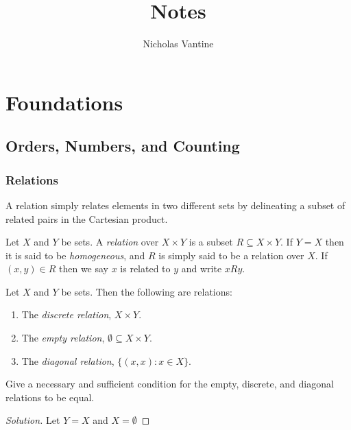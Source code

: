 \documentclass[12pt]{book}
\title{Notes}
\author{Nicholas Vantine}
\date{}
\begin{document}
\maketitle
\tableofcontents


\chapter{Foundations}

\section{Orders, Numbers, and Counting}

\subsection{Relations}

A relation simply relates elements in two different sets by delineating a subset of related pairs in the Cartesian product.

\begin{definition}
Let $X$ and $Y$ be sets. A \emph{relation} over $X \times Y$ is a subset $R \subseteq X \times Y$. If $Y = X$ then it is said to be \emph{homogeneous}, and $R$ is simply said to be a relation over $X$. If $(x,y) \in R$ then we say $x$ is related to $y$ and write $xRy$.
\end{definition}

\begin{example}
Let $X$ and $Y$ be sets. Then the following are relations:
\begin{enumerate}
    \item The \emph{discrete relation}, $X \times Y$.
    \item The \emph{empty relation}, $\emptyset \subseteq X \times Y$.
    \item The \emph{diagonal relation}, $\{(x,x) : x \in X\}$.
\end{enumerate}
\end{example}


\begin{exercise}
Give a necessary and sufficient condition for the empty, discrete, and diagonal relations to be equal.
\end{exercise}

\begin{proof}[Solution]
    Let $Y = X$ and $X = \emptyset$
\end{proof}
\end{document}
